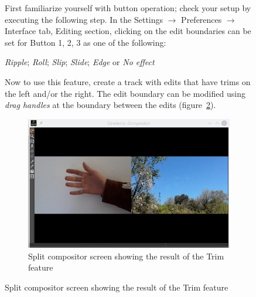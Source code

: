 \begin{figure}
First familiarize yourself with button operation; check your setup by executing the following step.  In the Settings $\rightarrow$ Preferences $\rightarrow$ Interface tab, Editing section, clicking on the edit boundaries can be set for Button 1, 2, 3 as one of the following:

\textit{Ripple}; \textit{Roll}; \textit{Slip}; \textit{Slide}; \textit{Edge} or \textit{No effect}

Now to use this feature, create a track with edits that have trims on the left and/or the right. The edit boundary can be modified using \textit{drag handles} at the boundary between the edits (figure~\ref{fig:trim-display}).
\begin{figure}[htpb]
    \centering
    \includegraphics[width=0.9\linewidth]{images/trim-display.png}
    \caption{Split compositor screen showing the result of the Trim feature}
    \label{fig:trim-display}
\end{figure}


\end{figure}
